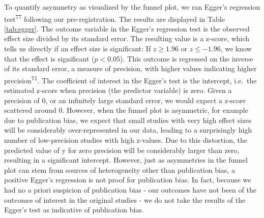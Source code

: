 \documentclass[
  man]{apa6}
\begin{document}
To quantify asymmetry as visualized by the funnel plot, we ran Egger's regression test\textsuperscript{77} following our pre-registration. The results are displayed in Table \ref{tab:egger}. The outcome variable in the Egger's regression test is the observed effect size divided by its standard error. The resulting value is a z-score, which tells us directly if an effect size is significant: If \(z \geq 1.96\) or \(z \leq -1.96\), we know that the effect is significant (\(p < 0.05\)). This outcome is regressed on the inverse of its standard error, a measure of precision, with higher values indicating higher precision\textsuperscript{71}. The coefficient of interest in the Egger's test is the intercept, i.e.~the estimated z-score when precision (the predictor variable) is zero. Given a precision of 0, or an infinitely large standard error, we would expect a z-score scattered around 0. However, when the funnel plot is asymmetric, for example due to publication bias, we expect that small studies with very high effect sizes will be considerably over-represented in our data, leading to a surprisingly high number of low-precision studies with high z-values. Due to this distortion, the predicted value of y for zero precision will be considerably larger than zero, resulting in a significant intercept. However, just as asymmetries in the funnel plot can stem from sources of heterogeneity other than publication bias, a positive Egger's regression is not proof for publication bias. In fact, because we had no a priori suspicion of publication bias - our outcomes have not been of the outcomes of interest in the original studies - we do not take the results of the Egger's test as indicative of publication bias.
\end{document}
